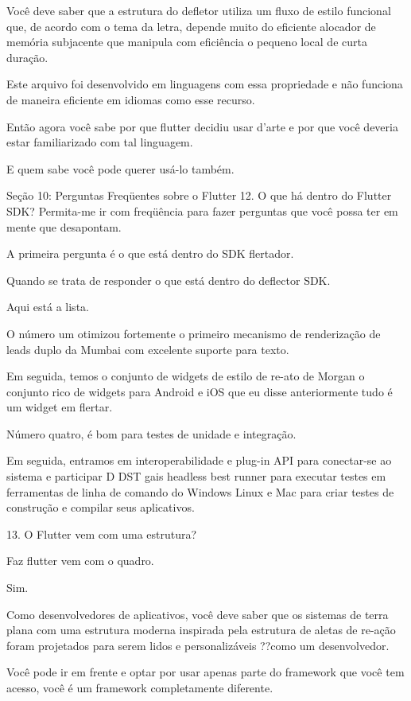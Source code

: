 Você deve saber que a estrutura do defletor utiliza um fluxo de estilo funcional que, de acordo com o tema da letra, depende muito do eficiente alocador de memória subjacente que manipula com eficiência o pequeno local de curta duração.

Este arquivo foi desenvolvido em linguagens com essa propriedade e não funciona de maneira eficiente em idiomas como esse recurso.

Então agora você sabe por que flutter decidiu usar d'arte e por que você deveria estar familiarizado com tal linguagem.

E quem sabe você pode querer usá-lo também.


Seção 10: Perguntas Freqüentes sobre o Flutter
12. O que há dentro do Flutter SDK?
Permita-me ir com freqüência para fazer perguntas que você possa ter em mente que desapontam.

A primeira pergunta é o que está dentro do SDK flertador.

Quando se trata de responder o que está dentro do deflector SDK.

Aqui está a lista.

O número um otimizou fortemente o primeiro mecanismo de renderização de leads duplo da Mumbai com excelente suporte para texto.

Em seguida, temos o conjunto de widgets de estilo de re-ato de Morgan o conjunto rico de widgets para Android e iOS que eu disse anteriormente tudo é um widget em flertar.

Número quatro, é bom para testes de unidade e integração.

Em seguida, entramos em interoperabilidade e plug-in API para conectar-se ao sistema e participar D DST gais headless best runner para executar testes em ferramentas de linha de comando do Windows Linux e Mac para criar testes de construção e compilar seus aplicativos.

13. O Flutter vem com uma estrutura?

Faz flutter vem com o quadro.

Sim.

Como desenvolvedores de aplicativos, você deve saber que os sistemas de terra plana com uma estrutura moderna inspirada pela estrutura de aletas de re-ação foram projetados para serem lidos e personalizáveis ??como um desenvolvedor.

Você pode ir em frente e optar por usar apenas parte do framework que você tem acesso, você é um framework completamente diferente.

